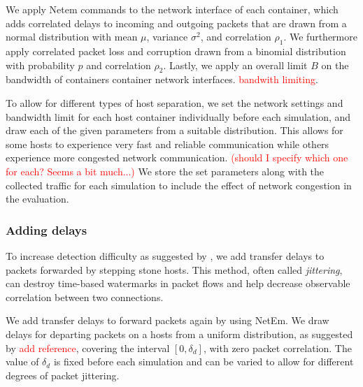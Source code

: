 \documentclass[runningheads]{llncs}\usepackage[]{graphicx}\usepackage[]{color}
\begin{document}
We apply Netem commands to the network interface of each container, which adds correlated delays to incoming and outgoing packets that are drawn from a normal distribution with mean $\mu$, variance $\sigma^2$, and correlation $\rho_1$. We furthermore apply correlated packet loss and corruption drawn from a binomial distribution with probability $p$ and correlation $\rho_2$. Lastly, we apply an overall limit $B$ on the bandwidth of containers container network interfaces.
 \textcolor{red}{bandwith limiting}.

To allow for different types of host separation, we set the network settings and bandwidth limit for each host container individually before each simulation, and draw each of the given parameters from a suitable distribution. This allows for some hosts to experience very fast and reliable communication while others experience more congested network communication.  \textcolor{red}{(should I specify which one for each? Seems a bit much...)} %
We store the set parameters along with the collected traffic for each simulation to include the effect of network congestion in the evaluation. 








\subsubsection{Adding delays}\label{Sec:delays_desc}

To increase detection difficulty as suggested by  \cite{padhye2010evading}, we add transfer delays to packets forwarded by stepping stone hosts. This method, often called \textit{jittering}, can destroy time-based watermarks in packet flows and help decrease observable correlation between two connections. 

We add transfer delays to forward packets again by using NetEm. We draw delays for departing packets on a hosts from a uniform distribution, as suggested by \textcolor{red}{add reference}, covering the interval $[0,\delta_d]$, with zero packet correlation. The value of $\delta_d$ is fixed before each simulation and can be varied to allow for different degrees of packet jittering. 
\end{document}
